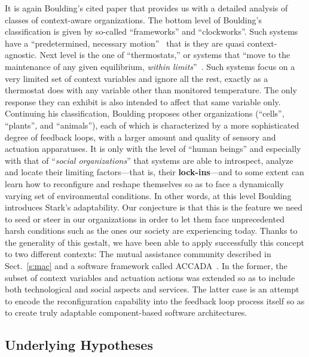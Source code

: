 \documentclass{llncs}
\begin{document}
It is again Boulding's cited paper that provides us with a detailed analysis of classes of context-aware
organizations. The bottom level of Boulding's classification is given by so-called ``frameworks'' and
``clockworks''. Such systems have a ``predetermined, necessary motion''~\cite{Bou56} that is they are
quasi context-agnostic. Next level is the one of ``thermostats,'' or systems that ``move to the
maintenance of any given equilibrium, \emph{within limits}''~\cite{Bou56}. Such systems focus on a very
limited set of context variables and ignore all the rest, exactly as a thermostat does with any variable
other than monitored temperature. The only response they can exhibit is also intended to affect that same
variable only. Continuing his classification, Boulding proposes other organizations (``cells'',
``plants'', and ``animals''), each of which is characterized by a more sophisticated degree of feedback
loops, with a larger amount and quality of sensory and actuation apparatuses. It is only with the level
of ``human beings'' and especially with that of ``\emph{social organizations}'' that systems are able to
introspect, analyze and locate their limiting factors---that is, their \textbf{lock-ins}---and to some
extent can learn how to reconfigure and reshape themselves so as to face a dynamically varying set of
environmental conditions. In other words, at this level Boulding introduces Stark's adaptability. Our
conjecture is that this is the feature we need to seed or steer in our organizations in order to let them
face unprecedented harsh conditions such as the ones our society are experiencing today. Thanks to the
generality of this gestalt, we have been able to apply successfully this concept to two different
contexts: The mutual assistance community described in Sect.~\ref{s:mac} and a software framework called
ACCADA~\cite{GuD10+}. In the former, the subset of context variables and actuation actions was extended
so as to include both technological and social aspects and services. The latter case is an attempt to
encode the reconfiguration capability into the feedback loop process itself so as to create truly
adaptable component-based software architectures.





\subsection{Underlying Hypotheses}
\end{document}
